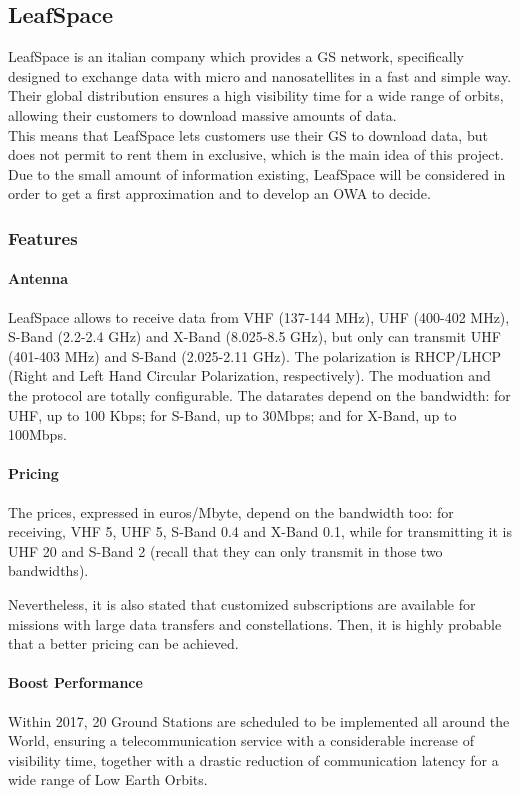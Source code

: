 \subsection{LeafSpace}
LeafSpace is an italian company which provides a GS network, specifically designed to exchange data with micro and nanosatellites in a fast and simple way. Their global distribution ensures a high visibility time for a wide range of orbits, allowing their customers to download massive amounts of data. \\
This means that LeafSpace lets customers use their GS to download data, but does not permit to rent them in exclusive, which is the main idea of this project. Due to the small amount of information existing, LeafSpace will be considered in order to get a first approximation and to develop an OWA to decide. 

\subsubsection{Features}
\paragraph{Antenna}
LeafSpace allows to receive data from VHF (137-144 MHz), UHF (400-402 MHz), S-Band (2.2-2.4 GHz) and X-Band (8.025-8.5 GHz), but only can transmit UHF (401-403 MHz) and S-Band (2.025-2.11 GHz). The polarization is RHCP/LHCP (Right and Left Hand Circular Polarization, respectively). The moduation and the protocol are totally configurable. The datarates depend on the bandwidth: for UHF, up to 100 Kbps; for S-Band, up to 30Mbps; and for X-Band, up to 100Mbps. 

\paragraph{Pricing}
The prices, expressed in euros/Mbyte, depend on the bandwidth too: for receiving, VHF 5, UHF 5, S-Band 0.4 and X-Band 0.1, while for transmitting it is UHF 20 and S-Band 2 (recall that they can only transmit in those two bandwidths). 

Nevertheless, it is also stated that customized subscriptions are available for missions with large data transfers and constellations. Then, it is highly probable that a better pricing can be achieved. 

\paragraph{Boost Performance}
Within 2017, 20 Ground Stations are scheduled to be implemented all around the World, ensuring a telecommunication service with a considerable increase of visibility time, together with a drastic reduction of communication latency for a wide range of Low Earth Orbits. 

